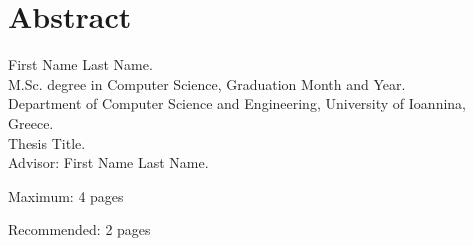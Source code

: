 \chapter*{Abstract}

First Name Last Name.\\
M.Sc. degree in Computer Science, Graduation Month and Year.\\
Department of Computer Science and Engineering, University of Ioannina, Greece.\\
Thesis Title.\\
Advisor: First Name Last Name.\\
\bigskip

\y\noindent Maximum: 4 pages

\y\noindent Recommended: 2 pages